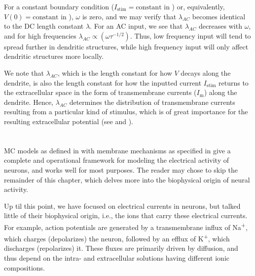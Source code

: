 For a constant boundary condition ($I_\text{stim} = \text{constant}$ in ) or, equivalently, $V(0) = \text{constant}$ in ), $\omega$ is zero, and we may verify that $\lambda_{AC}$ becomes identical to the DC length constant $\lambda$. For an AC input, we see that $\lambda_{AC}$ decreases with $\omega$, and for high frequencies $\lambda_{AC} \propto (\omega \tau^{-1/2})$. Thus, low frequency input will tend to spread further in dendritic structures, while high frequency input will only affect dendritic structures more locally. 

We note that $\lambda_{AC}$, which is the length constant for how $V$ decays along the dendrite, is also the length constant for how the inputted current $I_\text{stim}$ returns to the extracellular space in the form of transmembrane currents ($I_\text{m}$) along the dendrite. Hence, $\lambda_{AC}$ determines the distribution of transmembrane currents resulting from a particular kind of stimulus, which is of great importance for the resulting extracellular potential (see  and  ).




\section{}
\label{sec:Neuron:Ions_and_reversals}
MC models as defined in  with membrane mechanisms as specified in  give a complete and operational framework for modeling the electrical activity of neurons, and works well for most purposes. The reader may chose to skip the remainder of this chapter, which delves more into the biophysical origin of neural activity. 

Up til this point, we have focused on electrical currents in neurons, but talked little of their biophysical origin, i.e., the ions that carry these electrical currents. For example, action potentials are generated by a transmembrane influx of Na\textsuperscript{+}, 
which charges (depolarizes) the neuron, followed by an efflux of K\textsuperscript{+}, which discharges (repolarizes) it. These fluxes are primarily driven by diffusion, and thus depend on the intra- and extracellular solutions having different ionic compositions. 

